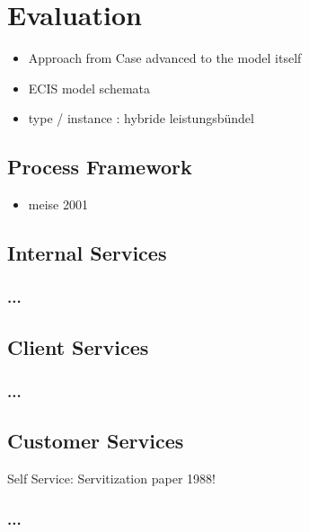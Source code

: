 \chapter{Evaluation}
\begin{itemize}
	\item Approach from Case advanced to the model itself
	\item ECIS model schemata
	\item type / instance : hybride leistungsbündel
\end{itemize}

	\section{Process Framework}
	\begin{itemize}
		\item meise 2001
	\end{itemize}
	\section{Internal Services}
	\subsection{...}
	\section{Client Services}
	\subsection{...}
	\section{Customer Services}
	Self Service: Servitization paper 1988!
	\subsection{...}
